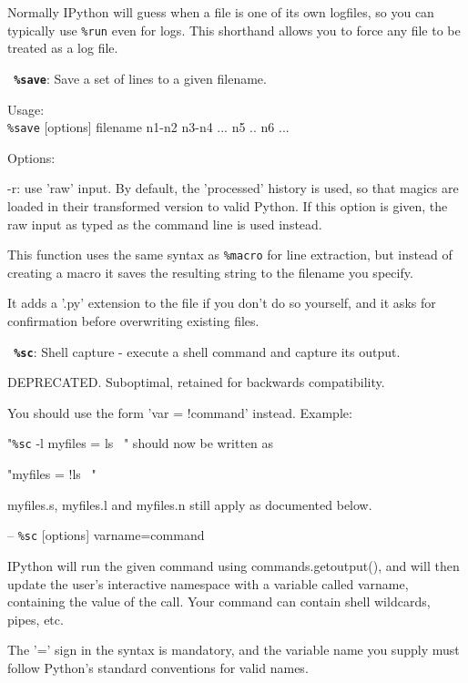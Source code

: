         Normally IPython will guess when a file is one of its own logfiles, so
        you can typically use \texttt{\%run} even for logs. This shorthand allows you to
        force any file to be treated as a log file.

\bigskip
\texttt{\textbf{ \%save}}:
	Save a set of lines to a given filename.

        Usage:\\
          \texttt{\%save} [options] filename n1-n2 n3-n4 ... n5 .. n6 ...

        Options:
        
          -r: use 'raw' input.  By default, the 'processed' history is used,
          so that magics are loaded in their transformed version to valid
          Python.  If this option is given, the raw input as typed as the
          command line is used instead.

        This function uses the same syntax as \texttt{\%macro} for line extraction, but
        instead of creating a macro it saves the resulting string to the
        filename you specify.

        It adds a '.py' extension to the file if you don't do so yourself, and
        it asks for confirmation before overwriting existing files.

\bigskip
\texttt{\textbf{ \%sc}}:
	Shell capture - execute a shell command and capture its output.

        DEPRECATED. Suboptimal, retained for backwards compatibility.
        
        You should use the form 'var = !command' instead. Example:
         
         "\texttt{\%sc} -l myfiles = ls ~" should now be written as
            
         "myfiles = !ls ~"
         
        myfiles.s, myfiles.l and myfiles.n still apply as documented
        below.

        --
        \texttt{\%sc} [options] varname=command

        IPython will run the given command using commands.getoutput(), and
        will then update the user's interactive namespace with a variable
        called varname, containing the value of the call.  Your command can
        contain shell wildcards, pipes, etc.

        The '=' sign in the syntax is mandatory, and the variable name you
        supply must follow Python's standard conventions for valid names.
        
